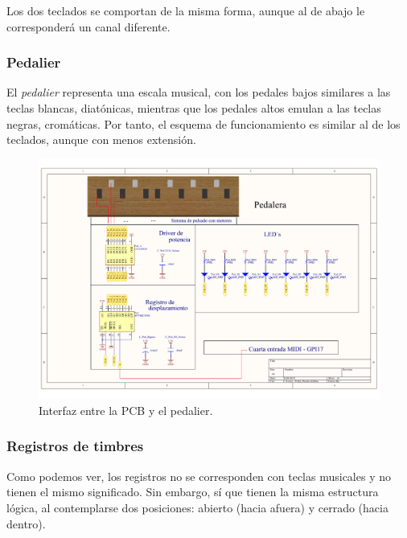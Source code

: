 \smallskip

Los dos teclados se comportan de la misma forma, aunque al de abajo le corresponderá un canal diferente.

\subsubsection{Pedalier}

El \textit{pedalier} representa una escala musical, con los pedales bajos similares a las teclas blancas, diatónicas, mientras que los pedales altos emulan a las teclas negras, cromáticas. Por tanto, el esquema de funcionamiento es similar al de los teclados, aunque con menos extensión.

\smallskip

\begin{figure}[H]
	\noindent \begin{centering}
		\includegraphics[width=\linewidth*2/3]{capitulo3/pcb_pedalier}
		\par\end{centering}
	\smallskip
	\caption{\label{fig:pcb_pedalier} Interfaz entre la PCB y el pedalier.}
\end{figure} 

\smallskip

\subsubsection{Registros de timbres}

Como podemos ver, los registros no se corresponden con teclas musicales y no tienen el mismo significado. Sin embargo, sí que tienen la misma estructura lógica, al contemplarse dos posiciones: abierto (hacia afuera) y cerrado (hacia dentro).

